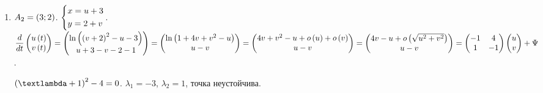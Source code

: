 \documentclass[a5paper,10pt]{article}
\begin{document}
\begin{enumerate}
    \item $A_{2} = \left(3; 2\right)$. $\left\{ \begin{aligned}& x = u + 3 \\& y = 2 + v\end{aligned} \right.$. 
    $\dfrac {d} {dt} \begin{pmatrix} u\br{t} \\ v\br{t} \end{pmatrix}
    = \begin{pmatrix} \ln\br{\br{v + 2}^2 - u - 3} \\ u + 3 - v - 2 - 1 \end{pmatrix}
    = \begin{pmatrix} \ln\br{1 + 4v + v^2 - u} \\ u - v \end{pmatrix}
    \linebreak
    = \begin{pmatrix} 4v + v^2 - u + o\br{u} + o\br{v} \\ u - v \end{pmatrix}
    = \begin{pmatrix} 4v - u + o\br{\sqrt{u^2 + v^2}} \\ u - v \end{pmatrix}
    = \begin{pmatrix} -1 & 4 \\ 1 & -1 \end{pmatrix} \begin{pmatrix} u \\ v \end{pmatrix} + \Psi$.
    
    $\br{\lambda + 1}^2 - 4 = 0$. $\lambda_{1} = -3$, $\lambda_{2} = 1$, точка неустойчива.
\end{enumerate}
\end{document}
